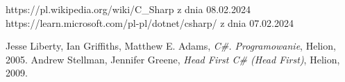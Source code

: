 \documentclass[polish,12pt,twoside,a4paper]{report}
\begin{document}




\newpage

\newpage

\newpage

\newpage

\newpage

\newpage

\newpage

\newpage

\begin{thebibliography}{6}

 https://pl.wikipedia.org/wiki/C\_Sharp z dnia 08.02.2024
 https://learn.microsoft.com/pl-pl/dotnet/csharp/ z dnia 07.02.2024

Jesse Liberty, Ian Griffiths, Matthew E. Adams, {\it C\#. Programowanie}, Helion,  2005.
Andrew Stellman, Jennifer Greene, {\it Head First C\# (Head First)}, Helion,  2009.
\end{thebibliography}
\newpage


\end{document}
